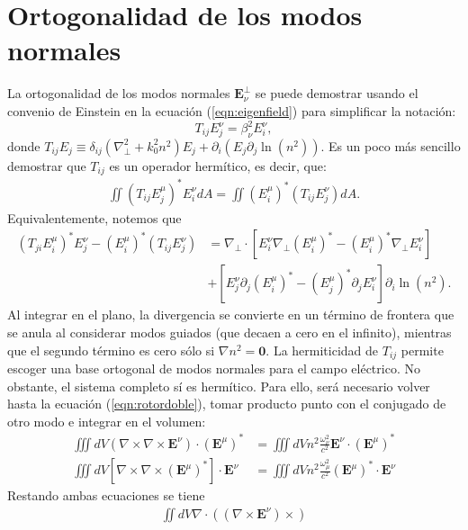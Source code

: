 \chapter{Ortogonalidad de los modos normales \label{sec:orto}}

La ortogonalidad de los modos normales $\textbf{E}_\nu^\perp$ se puede demostrar usando el convenio de Einstein en la ecuación (\ref{eqn:eigenfield}) para simplificar la notación:
\begin{equation}
	T_{ij} E^\nu_j = \beta_\nu^2 E^\nu_i, \label{eqn:eigentensorial}
\end{equation}
donde $T_{ij}E_j \equiv \delta_{ij}\left(\nabla_\perp^2 + k_0^2n^2\right)E_j+\partial_i \left(E_j  \partial_j\ln(n^2) \right) $. Es un poco más sencillo demostrar que $T_{ij}$ es un operador hermítico, es decir, que:
\begin{align*}
	\iint \left(T_{ij} E_j^\mu \right)^*  E_i^\nu dA = \iint \left( E_i^\mu \right)^*  \left(T_{ij} E_j^\nu\right) dA .
\end{align*}
Equivalentemente, notemos que
\begin{align*}
	\left(T_{ji} E_i^\mu \right)^* E_j^\nu  - \left( E_i^\mu \right)^*  \left(T_{ij} E_j^\nu \right) &= \nabla_\perp \cdot \left[E_i^\nu \nabla_\perp \left( E_i^\mu \right)^* - \left( E_i^\mu \right)^* \nabla_\perp E_i^\nu \right] 
	\\	
	&+ \left[E^\nu_j \partial_j \left( E_i^\mu \right)^*  - \left( E_j^\mu \right)^* \partial_j  E_i^\nu \right] \partial_i \ln(n^2).  
\end{align*}
Al integrar en el plano, la divergencia se convierte en un término de frontera que se anula al considerar modos guiados (que decaen a cero en el infinito), mientras que el segundo término es cero sólo si $\nabla n^2 = \textbf{0}$. La hermiticidad de $T_{ij}$ permite escoger una base ortogonal de modos normales para el campo eléctrico. No obstante, el sistema completo sí es hermítico. Para ello, será necesario volver hasta la ecuación (\ref{eqn:rotordoble}), tomar producto punto con el conjugado de otro modo e integrar en el volumen:
\begin{align*}
	\iiint dV \left(\nabla\times\nabla\times\textbf{E}^\nu \right)  \cdot \left(\textbf{E}^\mu\right)^* &= \iiint dV n^2\frac{\omega_\nu^2}{c^2} \textbf{E}^\nu \cdot \left(\textbf{E}^\mu\right)^*
	\\
	\iiint dV \left[\nabla\times\nabla\times\left(\textbf{E}^\mu\right)^* \right]  \cdot \textbf{E}^\nu &= \iiint dV n^2 \frac{\omega_\mu^2}{c^2} \left(\textbf{E}^\mu\right)^* \cdot \textbf{E}^\nu  
\end{align*}
Restando ambas ecuaciones se tiene
\begin{align*}
	\iint dV \nabla \cdot \left( \left(\nabla\times\textbf{E}^\nu\right) \times \right)
\end{align*}